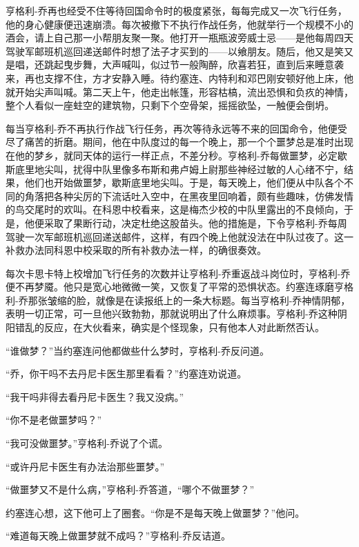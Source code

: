  


    亨格利-乔再也经受不住等待回国命令时的极度紧张，每每完成又一次飞行任务，他的身心健康便迅速崩溃。每次被撤下不执行作战任务，他就举行一个规模不小的酒会，请上自己那一小帮朋友聚一聚。他打开一瓶瓶波旁威士忌——是他每周四天驾驶军邮班机巡回递送邮件时想了法子才买到的——以飨朋友。随后，他又是笑又是唱，还跳起曳步舞，大声喊叫，似过节一般陶醉，欣喜若狂，直到后来睡意袭来，再也支撑不住，方才安静入睡。待约塞连、内特利和邓巴刚安顿好他上床，他就开始尖声叫喊。第二天上午，他走出帐篷，形容枯槁，流出恐惧和负疚的神情，整个人看似一座蛀空的建筑物，只剩下个空骨架，摇摇欲坠，一触便会倒坍。

    每当亨格利-乔不再执行作战飞行任务，再次等待永远等不来的回国命令，他便受尽了痛苦的折磨。期间，他在中队度过的每一个晚上，那一个个噩梦总是准时出现在他的梦乡，就同天体的运行一样正点，不差分秒。亨格利-乔每做噩梦，必定歇斯底里地尖叫，扰得中队里像多布斯和弗卢姆上尉那些神经过敏的人心绪不宁，结果，他们也开始做噩梦，歇斯底里地尖叫。于是，每天晚上，他们便从中队各个不同的角落把各种尖厉的下流话吐入空中，在黑夜里回响着，颇有些趣味，仿佛发情的鸟交尾时的欢叫。在科恩中校看来，这是梅杰少校的中队里露出的不良倾向，于是，他便采取了果断行动，决定杜绝这股苗头。他的措施是，下令亨格利-乔每周驾驶一次军邮班机巡回递送邮件，这样，有四个晚上他就没法在中队过夜了。这一补救办法同科恩中校采取的所有补救办法一样，的确很奏效。

    每次卡思卡特上校增加飞行任务的次数并让亨格利-乔重返战斗岗位时，亨格利-乔便不再梦魇。他只是宽心地微微一笑，又恢复了平常的恐惧状态。约塞连琢磨亨格利-乔那张皱缩的脸，就像是在读报纸上的一条大标题。每当亨格利-乔神情阴郁，表明一切正常，可一旦他兴致勃勃，那就说明出了什么麻烦事。亨格利-乔这种阴阳错乱的反应，在大伙看来，确实是个怪现象，只有他本人对此断然否认。

    “谁做梦？”当约塞连问他都做些什么梦时，亨格利-乔反问道。

    “乔，你干吗不去丹尼卡医生那里看看？”约塞连劝说道。

    “我干吗非得去看丹尼卡医生？我又没病。”

    “你不是老做噩梦吗？”

    “我可没做噩梦。”亨格利-乔说了个谎。

    “或许丹尼卡医生有办法治那些噩梦。”

    “做噩梦又不是什么病，”亨格利-乔答道，“哪个不做噩梦？”

    约塞连心想，这下他可上了圈套。“你是不是每天晚上做噩梦？”他问。

    “难道每天晚上做噩梦就不成吗？”亨格利-乔反诘道。

